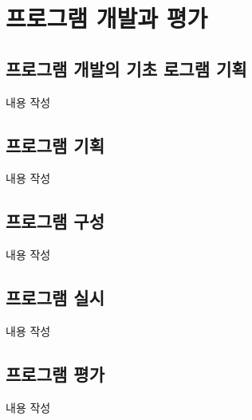 \section{프로그램 개발과 평가}

\subsection{프로그램 개발의 기초 로그램 기획}
내용 작성

\subsection{프로그램 기획}
내용 작성

\subsection{프로그램 구성}
내용 작성

\subsection{프로그램 실시}
내용 작성

\subsection{프로그램 평가}
내용 작성
